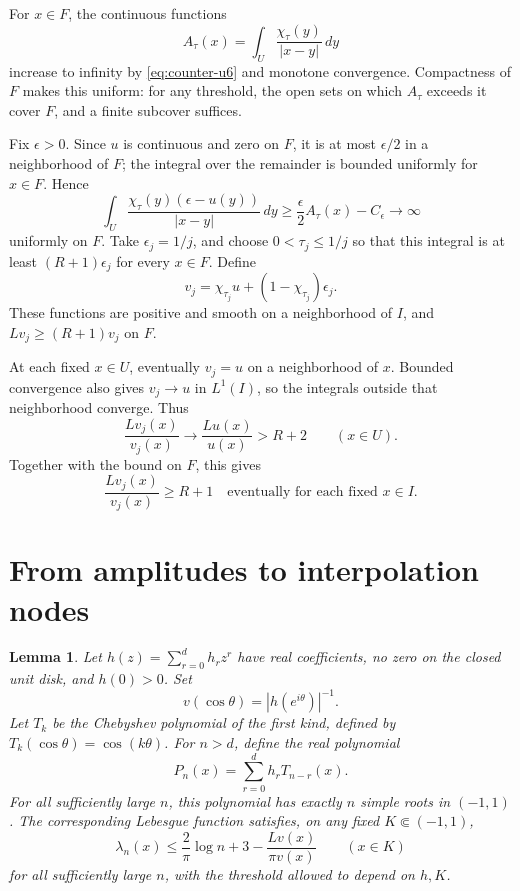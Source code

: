 \documentclass[11pt]{article}
\newtheorem{lemma}[theorem]{Lemma}
\theoremstyle{remark}
\numberwithin{equation}{section}
\begin{document}
For \(x\in F\), the continuous functions
\[
 A_\tau(x)=\int_U\frac{\chi_\tau(y)}{|x-y|}\,dy
\]
increase to infinity by \eqref{eq:counter-u6} and monotone convergence.
Compactness of \(F\) makes this uniform: for any threshold, the open
sets on which \(A_\tau\) exceeds it cover \(F\), and a finite subcover
suffices.

Fix \(\epsilon>0\). Since \(u\) is continuous and zero on \(F\), it
is at most \(\epsilon/2\) in a neighborhood of \(F\); the integral
over the remainder is bounded uniformly for \(x\in F\). Hence
\[
 \int_U\frac{\chi_\tau(y)(\epsilon-u(y))}{|x-y|}\,dy
 \ge\frac{\epsilon}{2}A_\tau(x)-C_\epsilon
 \longrightarrow\infty
\]
uniformly on \(F\).
Take \(\epsilon_j=1/j\), and choose \(0<\tau_j\le1/j\) so that this
integral is at least \((R+1)\epsilon_j\) for every \(x\in F\).
Define
\begin{equation}\label{eq:counter-u17}
 v_j=\chi_{\tau_j}u+(1-\chi_{\tau_j})\epsilon_j.
\end{equation}
These functions are positive and smooth on a neighborhood of \(I\),
and \(Lv_j\ge(R+1)v_j\) on \(F\).

At each fixed \(x\in U\), eventually \(v_j=u\) on a neighborhood of
\(x\). Bounded convergence also gives \(v_j\to u\) in \(L^1(I)\),
so the integrals outside that neighborhood converge. Thus
\begin{equation}\label{eq:counter-u18}
 \frac{Lv_j(x)}{v_j(x)}\longrightarrow\frac{Lu(x)}{u(x)}>R+2
 \qquad(x\in U).
\end{equation}
Together with the bound on \(F\), this gives
\begin{equation}\label{eq:counter-u19}
 \frac{Lv_j(x)}{v_j(x)}\ge R+1
 \quad\text{eventually for each fixed }x\in I.
\end{equation}

\section{From amplitudes to interpolation nodes}\label{subsec:counter-amplitude}


\begin{lemma}\label{lem:amplitude} Let \(h(z)=\sum_{r=0}^{d}h_rz^r\) have real coefficients, no zero on the closed unit disk, and \(h(0)>0\). Set
\[
 v(\cos\theta)=|h(e^{i\theta})|^{-1}.
\]
Let \(T_k\) be the Chebyshev polynomial of the first kind, defined by \(T_k(\cos\theta)=\cos(k\theta)\).
For \(n>d\), define the real polynomial
\begin{equation}\label{eq:counter-u25}
P_n(x)=\sum_{r=0}^{d}h_rT_{n-r}(x).
\end{equation}
For all sufficiently large \(n\), this polynomial has exactly \(n\) simple roots in \((-1,1)\). The corresponding Lebesgue function satisfies, on any fixed \(K\Subset(-1,1)\),
\begin{equation}\label{eq:counter-u26}
\lambda_n(x)\le\frac2\pi\log n+3-\frac{Lv(x)}{\pi v(x)}
 \qquad(x\in K)
\end{equation}
for all sufficiently large \(n\), with the threshold allowed to depend on \(h,K\).

\end{lemma}
\end{document}
